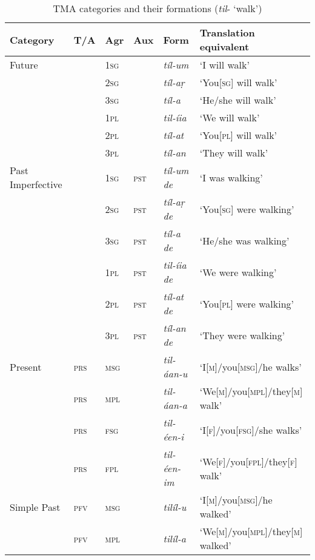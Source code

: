 \begin{sidewaystable}[p!]
\caption{TMA categories and their formations (\textit{til}- `walk')}
\begin{tabularx}{\textwidth}{ l l l l l l }
\lsptoprule
Category &
T/A &
Agr &
Aux &
Form &
Translation equivalent\\\hline
Future &
&
\textsc{1sg} &
&
\textit{tíl-um} &
`I will walk' \\
&
&
\textsc{2sg} &
&
\textit{tíl-aṛ} &
`You[\textsc{sg}] will walk' \\
&
&
\textsc{3sg} &
&
\textit{tíl-a} &
`He/she will walk' \\
&
&
\textsc{1pl} &
&
\textit{til-íia} &
`We will walk' \\
&
&
\textsc{2pl} &
&
\textit{tíl-at} &
`You[\textsc{pl}] will walk' \\
&
&
\textsc{3pl} &
&
\textit{tíl-an} &
`They will walk' \\
Past Imperfective &
&
\textsc{1sg} &
\textsc{pst} &
\textit{tíl-um de} &
`I was walking' \\
&
&
\textsc{2sg} &
\textsc{pst} &
\textit{tíl-aṛ de} &
`You[\textsc{sg}] were walking' \\
&
&
\textsc{3sg} &
\textsc{pst} &
\textit{tíl-a de} &
`He/she was walking' \\
&
&
\textsc{1pl} &
\textsc{pst} &
\textit{til-íia de} &
`We were walking' \\
&
&
\textsc{2pl} &
\textsc{pst} &
\textit{tíl-at de} &
`You[\textsc{pl}] were walking' \\
&
&
\textsc{3pl} &
\textsc{pst} &
\textit{tíl-an de} &
`They were walking' \\
Present &
\textsc{prs} &
\textsc{msg} &
&
\textit{til-áan-u} &
`I[\textsc{m}]/you[\textsc{msg}]/he walks' \\
&
\textsc{prs} &
\textsc{mpl} &
&
\textit{til-áan-a} &
`We[\textsc{m}]/you[\textsc{mpl}]/they[\textsc{m}] walk' \\
&
\textsc{prs} &
\textsc{fsg} &
&
\textit{til-éen-i} &
`I[\textsc{f}]/you[\textsc{fsg}]/she walks' \\
&
\textsc{prs} &
\textsc{fpl} &
&
\textit{til-éen-im} &
`We[\textsc{f}]/you[\textsc{fpl}]/they[\textsc{f}] walk' \\
Simple Past &
\textsc{pfv} &
\textsc{msg} &
&
\textit{tilíl-u} &
`I[\textsc{m}]/you[\textsc{msg}]/he walked' \\
&
\textsc{pfv} &
\textsc{mpl} &
&
\textit{tilíl-a} &
`We[\textsc{m}]/you[\textsc{mpl}]/they[\textsc{m}] walked' \\

\end{tabularx}
\end{sidewaystable}
